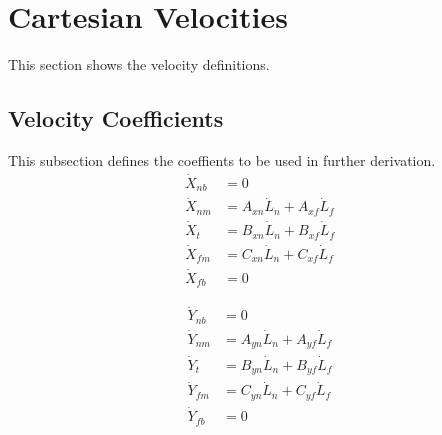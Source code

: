 \documentclass[11pt, landscape]{article}
\begin{document}
\section{Cartesian Velocities}
This section shows the velocity definitions. \\

\subsection{Velocity Coefficients}
This subsection defines the coeffients to be used in further derivation.\\

\begin{align}
  \dot{X}_{nb} &= 0 \\
  \dot{X}_{nm} &= A_{xn}\dot{L}_n + A_{xf}\dot{L}_f\\
  \dot{X}_{t } &= B_{xn}\dot{L}_n + B_{xf}\dot{L}_f\\
  \dot{X}_{fm} &= C_{xn}\dot{L}_n + C_{xf}\dot{L}_f\\
  \dot{X}_{fb} &= 0
\end{align}  

\begin{align}                                                                          
  \dot{Y}_{nb} &= 0 \\                           
  \dot{Y}_{nm} &= A_{yn}\dot{L}_n + A_{yf}\dot{L}_f\\
  \dot{Y}_{t}  &= B_{yn}\dot{L}_n + B_{yf}\dot{L}_f\\
  \dot{Y}_{fm} &= C_{yn}\dot{L}_n + C_{yf}\dot{L}_f\\
  \dot{Y}_{fb} &= 0 \\
\end{align}
\end{document}
